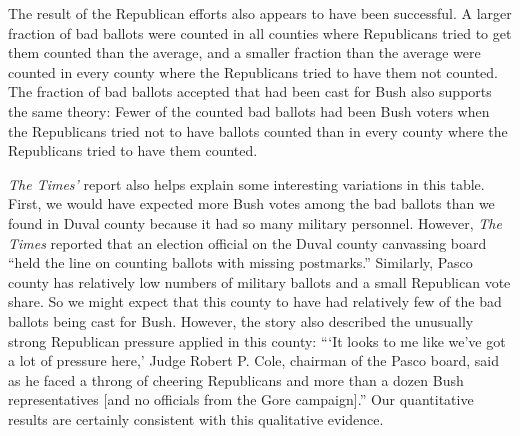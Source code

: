 \documentclass[11pt,titlepage]{article}
\begin{document}
The result of the Republican efforts also appears to have been
successful.  A larger fraction of bad ballots were counted in all
counties where Republicans tried to get them counted than the average,
and a smaller fraction than the average were counted in every county
where the Republicans tried to have them not counted.  
The fraction of bad ballots accepted that had been cast for Bush also
supports the same theory: Fewer of the counted bad ballots had been
Bush voters when the Republicans tried not to have ballots counted
than in every county where the Republicans tried to have them counted.

\emph{The Times'} report also helps explain some interesting
variations in this table.  First, we would have expected more Bush
votes among the bad ballots than we found in Duval county because it
had so many military personnel.  However, \emph{The Times} reported
that an election official on the Duval county canvassing board ``held
the line on counting ballots with missing postmarks.''  Similarly,
Pasco county has relatively low numbers of military ballots and a
small Republican vote share.  So we might expect that this county to
have had relatively few of the bad ballots being cast for Bush.
However, the story also described the unusually strong Republican
pressure applied in this county: ```It looks to me like we've got a
lot of pressure here,' Judge Robert P.  Cole, chairman of the Pasco
board, said as he faced a throng of cheering Republicans and more than
a dozen Bush representatives [and no officials from the Gore
campaign].''  Our quantitative results are certainly consistent with
this qualitative evidence.
\end{document}
